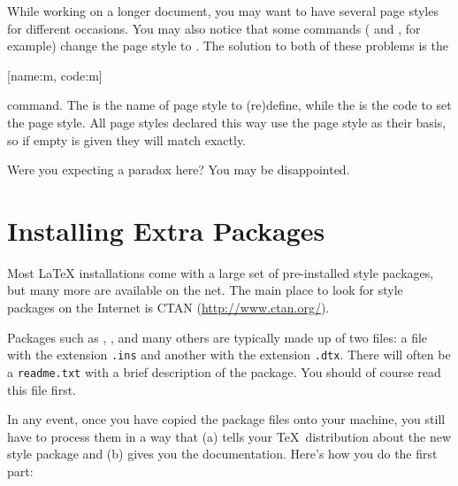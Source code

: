 While working on a longer document, you may want to have several page styles for
different occasions. You may also notice that some commands ( and
, for example) change the page style to .
The solution to both of these problems is the
\begin{lscommand}
  [name:m, code:m]
\end{lscommand}
command. The  is the name of page style to (re)define, while the %
 is the code to set the page style. All page styles declared this
way use the  page style as their basis, so if empty  is
given they will match  exactly.
\begin{example}[standalone, paperheight=3cm]
\geometry{includehead, includefoot, headsep=.5em, footskip=1em} %
\sloppy %
\usepackage{fancyhdr}%
\usepackage{extramarks}%
\pagestyle{mine}

Were you expecting a paradox here?
\noindent
You may be disappointed.

\end{example}


\section{Installing Extra Packages}\label{sec:Packages}

Most \LaTeX{} installations come with a large set of pre-installed
style packages, but many more are available on the net. The main
place to look for style packages on the Internet is CTAN (\url{http://www.ctan.org/}).

Packages such as , , and many
others are typically made up of two files: a file with the extension
\texttt{.ins} and another with the extension \texttt{.dtx}. There
will often be a \texttt{readme.txt} with a brief description of the
package. You should of course read this file first.

In any event, once you have copied the package files onto your
machine, you still have to process them in a way that (a) tells your
\TeX\ distribution about the new style package and (b) gives you
the documentation.  Here's how you do the first part:

